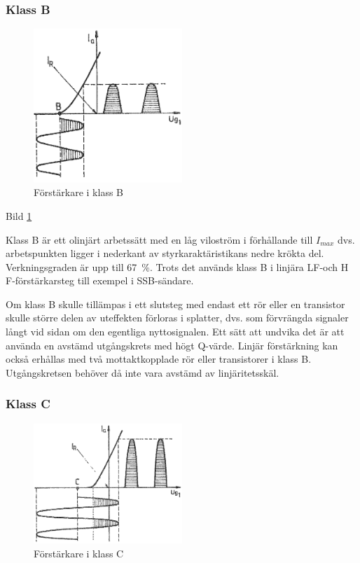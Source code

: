 \subsubsection{Klass B}

\begin{figure}
\includegraphics[width=0.5\textwidth]{images/cropped_pdfs/bild_2_3-45.pdf}
\caption{Förstärkare i klass B}
\label{fig:BildII3-45}
\end{figure}

Bild \ref{fig:BildII3-45}

Klass B är ett olinjärt arbetssätt med en låg viloström i förhållande
till \(I_{max}\) dvs. arbetspunkten ligger i nederkant av
styrkaraktäristikans nedre krökta del. Verkningsgraden är upp till
67~\%. Trots det används klass B i linjära LF-och H F-förstärkarsteg
till exempel i SSB-sändare.

Om klass B skulle tillämpas i ett slutsteg med endast ett rör eller en
transistor skulle större delen av uteffekten förloras i splatter,
dvs. som förvrängda signaler långt vid sidan om den egentliga nyttosignalen.
Ett sätt att undvika det är att använda en avstämd utgångskrets med högt
Q-värde.
Linjär förstärkning kan också erhållas med två mottaktkopplade rör eller
transistorer i klass B.
Utgångskretsen behöver då inte vara avstämd av linjäritetsskäl.

\subsubsection{Klass C}

\begin{figure}
\includegraphics[width=0.5\textwidth]{images/cropped_pdfs/bild_2_3-46.pdf}
\caption{Förstärkare i klass C}
\label{fig:BildII3-46}
\end{figure}

